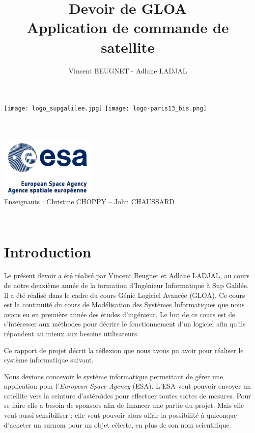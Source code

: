 \documentclass[11pt,a4paper]{article}
\author{Vincent BEUGNET - Adlane LADJAL}
\title{Devoir de GLOA \\ Application de commande de satellite}
\begin{document}
\makeatletter
\begin{titlepage}
	\centering
	\texttt{[image: logo\_supgalilee.jpg]}
	\hfill
	\texttt{[image: logo-paris13\_bis.png]} \\
    \vspace{5cm}
       {\LARGE \textbf{\@title}} \\
    \vspace{2em}
        {\large \@author }\\
    \vspace{1em}
        {\textit{\@date}} \\
    \vspace{2em}
    		\includegraphics[width=0.35\textwidth]{logo-esa.jpg}\\
    	\vspace{2em}
    		{Enseignants : Christine CHOPPY -- John CHAUSSARD} \\
    \vfill
\end{titlepage}


\newpage
~
\newpage

\renewcommand{\contentsname}{Sommaire}
\tableofcontents

\newpage

\pagestyle{empty}

\section{Introduction}
Le présent devoir a été réalisé par Vincent Beugnet 
et Adlane LADJAL, au cours de notre deuxième année 
de la  formation d'Ingénieur Informatique à 
Sup Galilée. Il a été réalisé dans le cadre du cours 
Génie Logiciel Avancée (GLOA). Ce cours est la continuité
du cours de Modélisation des Systèmes Informatiques
que nous avons eu en première année des études d'ingénieur.
Le but de ce cours est de s'intéresser aux méthodes pour
décrire le fonctionnement d'un logiciel afin qu'ils répondent
au mieux aux besoins utilisateurs.

Ce rapport de projet décrit la réflexion que nous avons pu 
avoir pour réaliser le système informatique suivant.

Nous devions concevoir le système informatique permettant
de gérer une application pour l’\textit{European Space Agency}
(ESA). L’ESA veut pouvoir envoyer un satellite vers la ceinture
d'astéro\"ides pour effectuer toutes sortes de mesures.
Pour se faire elle a besoin de sponsors afin de financer une
partie du projet. Mais elle veut aussi sensibiliser : elle veut
pouvoir alors offrir la possibilité à quiconque d'acheter un
surnom pour un objet céleste, en plus de son nom scientifique.
\end{document}

